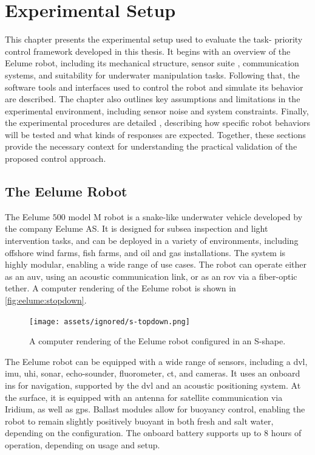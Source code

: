 \chapter{Experimental Setup}

This chapter presents the experimental setup used to evaluate the task-
priority control framework developed in this thesis. It begins with an 
overview of the Eelume robot, including its mechanical structure, sensor suite
, communication systems, and suitability for underwater manipulation tasks. 
Following that, the software tools and interfaces used to control the robot 
and simulate its behavior are described. The chapter also outlines key 
assumptions and limitations in the experimental environment, including sensor 
noise and system constraints. Finally, the experimental procedures are detailed
, describing how specific robot behaviors will be tested and what kinds of 
responses are expected. Together, these sections provide the necessary context 
for understanding the practical validation of the proposed control approach.

\section{The Eelume Robot}

The Eelume \(500\) model M robot is a snake-like underwater vehicle developed by 
the company Eelume AS. It is designed for subsea inspection and light 
intervention tasks, and can be deployed in a variety of environments, 
including offshore wind farms, fish farms, and oil and gas installations. The 
system is highly modular, enabling a wide range of use cases.
The robot can operate either as an \gls{auv}, using an acoustic communication 
link, or as an \gls{rov} via a fiber-optic tether. A computer rendering of the 
Eelume robot is shown in \autoref{fig:eelume:stopdown}.

\begin{figure}[h!]
    \centering
    \texttt{[image: assets/ignored/s-topdown.png]}
    \caption{A computer rendering of the Eelume robot configured in an S-shape.}
    \label{fig:eelume:stopdown}
\end{figure}

The Eelume robot can be equipped with a wide range of sensors, including a \gls{dvl},
\gls{imu}, \gls{uhi}, sonar, echo-sounder, fluorometer, \gls{ct}, and 
cameras. It uses an onboard \gls{ins} for navigation, supported by the \gls{dvl}
and an acoustic positioning system. At the surface, it is equipped with an 
antenna for satellite communication via Iridium, as well as \gls{gps}. Ballast 
modules allow for buoyancy control, enabling the robot to remain slightly 
positively buoyant in both fresh and salt water, depending on the configuration.
The onboard battery supports up to $8$ hours of operation, depending on 
usage and setup.

